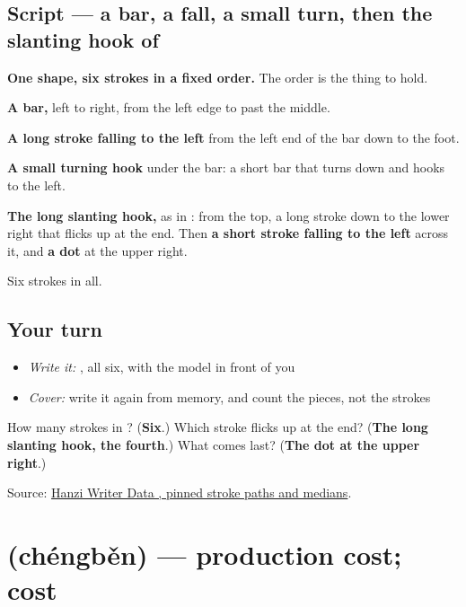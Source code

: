 \subsection*{Script — a bar, a fall, a small turn, then the slanting hook of }

\begin{quote}
\end{quote}

\textbf{One shape, six strokes in a fixed order.} The order is the thing to hold.

\textbf{A bar,} left to right, from the left edge to past the middle.

\textbf{A long stroke falling to the left} from the left end of the bar down to the foot.

\textbf{A small turning hook} under the bar: a short bar that turns down and hooks to the left.

\textbf{The long slanting hook,} as in : from the top, a long stroke down to the lower right that flicks up at the end. Then \textbf{a short stroke falling to the left} across it, and \textbf{a dot} at the upper right.

Six strokes in all.

\subsection*{Your turn}
\begin{itemize}
\raggedright
  \item \emph{Write it:} , all six, with the model in front of you
  \item \emph{Cover:} write it again from memory, and count the pieces, not the strokes
\end{itemize}

\begin{tcolorbox}[breakable,colback=teal!4,colframe=teal!35!black,title={Before you move on}]
How many strokes in ? (\textbf{Six}.) Which stroke flicks up at the end? (\textbf{The long slanting hook, the fourth}.) What comes last? (\textbf{The dot at the upper right}.)

Source: \href{https://raw.githubusercontent.com/chanind/hanzi-writer-data/68d10a4b21150cae5e1ebbd223eed289cf32d90c/data/\%E6\%88\%90.json}{Hanzi Writer Data , pinned stroke paths and medians}.
\end{tcolorbox}
\section[\texorpdfstring{\zh{成本} (chéngběn)}{成本 (chéngběn)}]{ (chéngběn) — production cost; cost}

